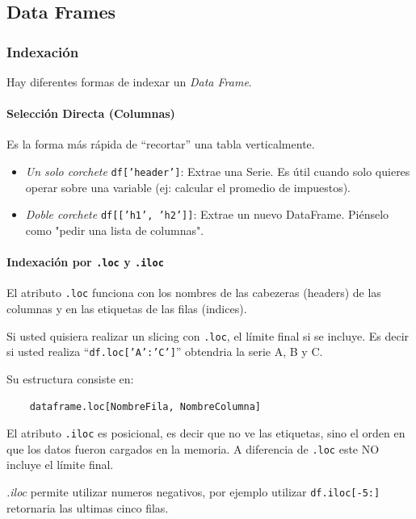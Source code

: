 \subsection{Data Frames}

\subsubsection{Indexación}

Hay diferentes formas de indexar un \textit{Data Frame}. 

\paragraph{Selección Directa (Columnas)}

Es la forma más rápida de ``recortar'' una tabla verticalmente.
\begin{itemize}
\item \textit{Un solo corchete} \texttt{df['header']}: Extrae una Serie. Es útil cuando solo quieres operar sobre una variable (ej: calcular el promedio de impuestos).
\item \textit{Doble corchete} \texttt{df[['h1', 'h2']]}: Extrae un nuevo DataFrame. Piénselo como "pedir una lista de columnas". 
\end{itemize}

\paragraph{Indexación por \texttt{.loc} y \texttt{.iloc}}

El atributo \texttt{.loc} funciona con los nombres de las cabezeras (headers) de las columnas y en las etiquetas de las filas (indices).

Si usted quisiera realizar un slicing con \texttt{.loc}, el límite final si se incluye. Es decir si usted realiza ``\texttt{df.loc['A':'C']}'' obtendria la serie A, B y C. 

Su estructura consiste en:
\begin{verbatim}
    dataframe.loc[NombreFila, NombreColumna]
\end{verbatim}

El atributo \texttt{.iloc} es posicional, es decir que no ve las etiquetas, sino el orden en que los datos fueron cargados en la memoria. A diferencia de \texttt{.loc} este NO incluye el límite final. 

\textit{.iloc} permite utilizar numeros negativos, por ejemplo utilizar \texttt{df.iloc[-5:]} retornaria las ultimas cinco filas.

